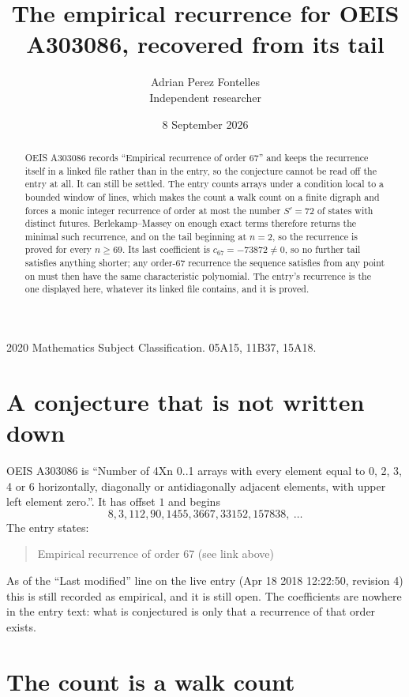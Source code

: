 \documentclass[11pt,a4paper]{article}
\title{The empirical recurrence for OEIS A303086, recovered from its tail}
\author{Adrian Perez Fontelles\\ \small Independent researcher}
\date{8 September 2026}
\theoremstyle{plain}
\theoremstyle{definition}
\begin{document}
\maketitle

\begin{abstract}
OEIS A303086 records ``Empirical recurrence of order $67$'' and keeps the recurrence itself in
a linked file rather than in the entry, so the conjecture cannot be read off the entry at all.
It can still be settled. The entry counts arrays under a condition local to a bounded window of
lines, which makes the count a walk count on a finite digraph and forces a monic integer
recurrence of order at most the number $S'=72$ of states with distinct futures. Berlekamp--Massey on
enough exact terms therefore returns the minimal such recurrence, and on the tail beginning at $n=2$, so the recurrence is proved for every $n\ge69$.
Its last coefficient is $c_{67}=-73872\neq0$, so no further tail satisfies anything
shorter; any order-$67$ recurrence the sequence satisfies from any point on must then have
the same characteristic polynomial. The entry's recurrence is the one displayed here, whatever
its linked file contains, and it is proved.
\end{abstract}

\noindent\small 2020 Mathematics Subject Classification. 05A15, 11B37, 15A18.\normalsize

\section{A conjecture that is not written down}

OEIS A303086 is ``Number of 4Xn 0..1 arrays with every element equal to 0, 2, 3, 4 or 6 horizontally, diagonally or antidiagonally adjacent elements, with upper left element zero.''. It has offset $1$ and begins
\[
8, 3, 112, 90, 1455, 3667, 33152, 157838,\ \dots
\]
The entry states:
\begin{quote}
Empirical recurrence of order 67 (see link above)
\end{quote}
As of the ``Last modified'' line on the live entry (Apr 18 2018 12:22:50, revision 4)
this is still recorded as empirical, and it is still open. The coefficients are nowhere in the
entry text: what is conjectured is only that a recurrence of that order exists.

\section{The count is a walk count}
\end{document}

